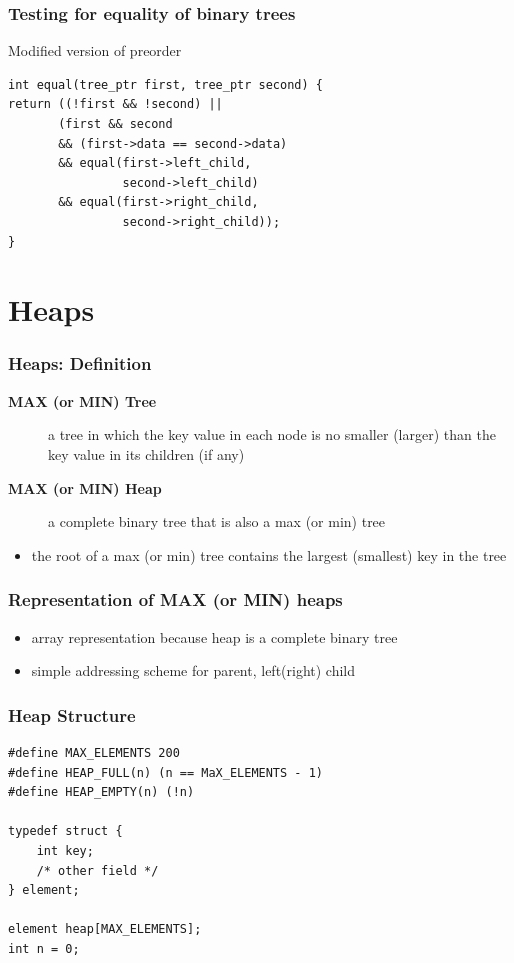 \documentclass[newPxFont,sthlmFooter,nooffset]{beamer}
\begin{document}
\begin{frame}[t, fragile]
  \frametitle{Testing for equality of binary trees}
Modified version of preorder
\begin{lstlisting}
int equal(tree_ptr first, tree_ptr second) {
return ((!first && !second) || 
       (first && second 
       && (first->data == second->data) 
       && equal(first->left_child,
                second->left_child) 
       && equal(first->right_child,
                second->right_child));
}
\end{lstlisting}
\end{frame}

\section{Heaps}
\begin{frame}[t]
  \frametitle{Heaps: Definition}
  \begin{description}
  \item[\textbf{MAX (or MIN) Tree}] a tree in which the key value in each node is no smaller (larger) than the key value in its children (if any)
  \item [\textbf{MAX (or MIN) Heap}] a complete binary tree that is also a max (or min) tree
  \end{description}
  \begin{itemize}
  \item the root of a max (or min) tree contains the largest (smallest) key in the tree
  \end{itemize}
\end{frame}


\begin{frame}[t]
  \frametitle{Representation of MAX (or MIN) heaps}
  \begin{itemize}
  \item array representation because heap is a complete binary tree

  \item simple addressing scheme for parent, left(right) child
  \end{itemize}

\end{frame}


\begin{frame}[t, fragile]
  \frametitle{Heap Structure}
  \begin{lstlisting}
#define MAX_ELEMENTS 200
#define HEAP_FULL(n) (n == MaX_ELEMENTS - 1) 
#define HEAP_EMPTY(n) (!n)

typedef struct {
    int key;
    /* other field */ 
} element;

element heap[MAX_ELEMENTS]; 
int n = 0;    
  \end{lstlisting}
\end{frame}
\end{document}

